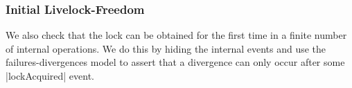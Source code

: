 





\subsubsection{Initial Livelock-Freedom}\label{initial-livelock-freedom}

We also check that the lock can be obtained for the first time in a finite number of internal operations. We do this by hiding the internal events and use the failures-divergences model to assert that a divergence can only occur after some |lockAcquired| event.


